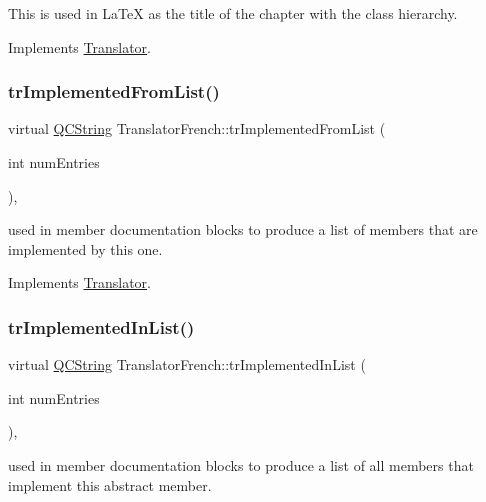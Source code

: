 This is used in La\+TeX as the title of the chapter with the class hierarchy. 

Implements \mbox{\hyperlink{class_translator}{Translator}}.

\mbox{\label{class_translator_french_a4c32ac79188e1f48f7fb8a90cd83b200}} 
\subsubsection{\texorpdfstring{trImplementedFromList()}{trImplementedFromList()}}
{\footnotesize\ttfamily virtual \mbox{\hyperlink{class_q_c_string}{Q\+C\+String}} Translator\+French\+::tr\+Implemented\+From\+List (\begin{DoxyParamCaption}\item[{int}]{num\+Entries }\end{DoxyParamCaption})\hspace{0.3cm}{\ttfamily [inline]}, {\ttfamily [virtual]}}

used in member documentation blocks to produce a list of members that are implemented by this one. 

Implements \mbox{\hyperlink{class_translator}{Translator}}.

\mbox{\label{class_translator_french_a134bfdcad56f13e649bbdb79abd785a0}} 
\subsubsection{\texorpdfstring{trImplementedInList()}{trImplementedInList()}}
{\footnotesize\ttfamily virtual \mbox{\hyperlink{class_q_c_string}{Q\+C\+String}} Translator\+French\+::tr\+Implemented\+In\+List (\begin{DoxyParamCaption}\item[{int}]{num\+Entries }\end{DoxyParamCaption})\hspace{0.3cm}{\ttfamily [inline]}, {\ttfamily [virtual]}}

used in member documentation blocks to produce a list of all members that implement this abstract member. 

